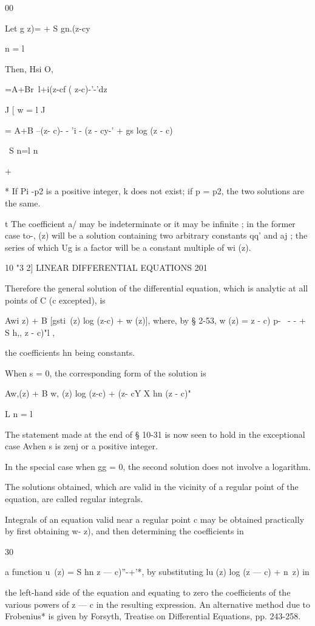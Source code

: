 00

Let g z)= + S gn.(z-cy\

n = l

Then, Hsi O,

 =A+Br\ l+i(z-cf ( z-c)-'-'dz

J [ w = l J

= A+B --(z- c)- - 'i - (z - cy-' + gs log (z - c)

\ S n=l n

+ %

* If Pi -p2 is a positive integer, k does not exist; if p = p2, the
two solutions are the same.

t The coefficient a/ may be indeterminate or it may be infinite ; in
the former case to-, (z) will be a solution containing two arbitrary
constants qq' and aj ; the series of which Ug is a factor will be a
constant multiple of wi (z).



10 "3 2] LINEAR DIFFERENTIAL EQUATIONS 201

Therefore the general solution of the differential equation, which is
analytic at all points of C (c excepted), is

Awi z) + B [gsti\ (z) log (z-c) + w (z)], where, by § 2-53, w (z) = z
- c) p- \ - - + S h,, z - c)"l ,

the coefficients hn being constants.

When s = 0, the corresponding form of the solution is

Aw,(z) + B w, (z) log (z-c) + (z- cY X hn (z - c)"

L n = l \

The statement made at the end of § 10-31 is now seen to hold in the
exceptional case Avhen s is zenj or a positive integer.

In the special case when gg = 0, the second solution does not involve
a logarithm.

The solutions obtained, which are valid in the vicinity of a regular
point of the equation, are called regular integrals.

Integrals of an equation valid near a regular point c may be obtained
practically by first obtaining w- z), and then determining the
coefficients in

30

a function u\ (z) = S hn z — c)''-+'*, by substituting lu (z) log (z —
c) + n\ z) in

the left-hand side of the equation and equating to zero the
coefficients of the various powers of z — c in the resulting
expression. An alternative method due to Frobenius* is given by
Forsyth, Treatise on Differential Equations, pp. 243-258.


